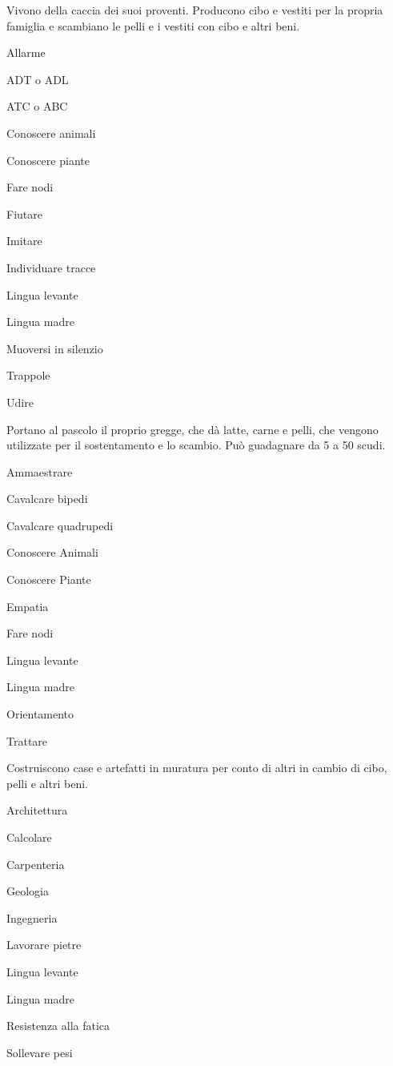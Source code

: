 Vivono della caccia dei suoi proventi. Producono cibo e vestiti per la
propria famiglia e scambiano le pelli e i vestiti con cibo e altri
beni.

\begin{abilist}
\item Allarme
\item ADT o ADL 
\item ATC o ABC
\item Conoscere animali
\item Conoscere piante
\item Fare nodi
\item Fiutare 
\item Imitare
\item Individuare tracce
\item Lingua levante
\item Lingua madre
\item Muoversi in silenzio
\item Trappole
\item Udire
\end{abilist}


Portano al pascolo il proprio gregge, che
d\`a latte, carne e pelli, che vengono utilizzate per il sostentamento e
lo scambio. Pu\`o guadagnare da 5 a 50 scudi.

\begin{abilist}
\item Ammaestrare
\item Cavalcare bipedi
\item Cavalcare quadrupedi
\item Conoscere Animali
\item Conoscere Piante
\item Empatia
\item Fare nodi
\item Lingua levante
\item Lingua madre
\item Orientamento
\item Trattare
\end{abilist}


 Costruiscono case e artefatti in muratura per conto di altri in
cambio di cibo, pelli e altri beni.

\begin{abilist}
\item Architettura
\item Calcolare
\item Carpenteria
\item Geologia
\item Ingegneria
\item Lavorare pietre
\item Lingua levante
\item Lingua madre
\item Resistenza alla fatica
\item Sollevare pesi
\end{abilist}

